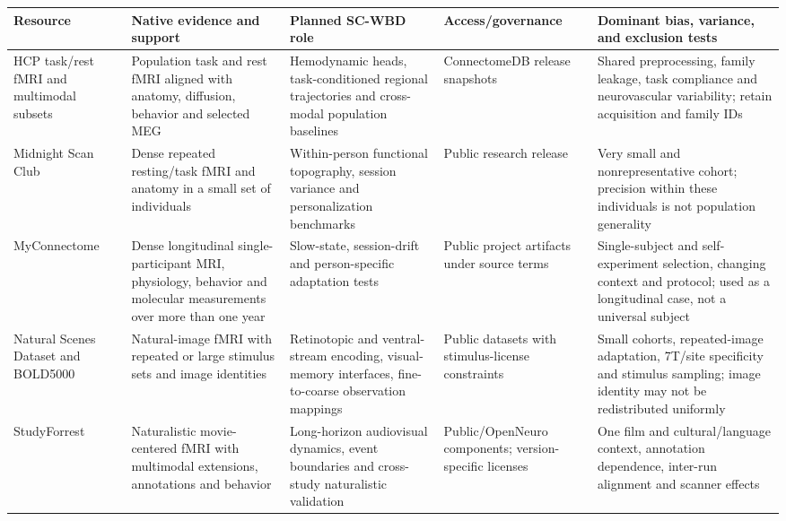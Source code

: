 \clearpage
\begin{table}[!h]
\centering
\footnotesize
\setlength{\tabcolsep}{3pt}
\renewcommand{\arraystretch}{1.08}
\begin{tabularx}{\textwidth}{@{}p{}p{}p{}p{}X@{}}
\toprule
\textbf{Resource} & \textbf{Native evidence and support} &
\textbf{Planned SC-WBD role} & \textbf{Access/governance} &
\textbf{Dominant bias, variance, and exclusion tests}\\
\midrule
HCP task/rest fMRI and multimodal subsets \citep{vanessen2013} &
Population task and rest fMRI aligned with anatomy, diffusion, behavior and
selected MEG &
Hemodynamic heads, task-conditioned regional trajectories and cross-modal
population baselines &
ConnectomeDB release snapshots &
Shared preprocessing, family leakage, task compliance and neurovascular
variability; retain acquisition and family IDs\\

Midnight Scan Club \citep{gordon2017msc} &
Dense repeated resting/task fMRI and anatomy in a small set of individuals &
Within-person functional topography, session variance and personalization
benchmarks &
Public research release &
Very small and nonrepresentative cohort; precision within these individuals
is not population generality\\

MyConnectome \citep{poldrack2015myconnectome} &
Dense longitudinal single-participant MRI, physiology, behavior and molecular
measurements over more than one year &
Slow-state, session-drift and person-specific adaptation tests &
Public project artifacts under source terms &
Single-subject and self-experiment selection, changing context and protocol;
used as a longitudinal case, not a universal subject\\

Natural Scenes Dataset \citep{allen2022nsd} and BOLD5000
\citep{chang2019bold5000} &
Natural-image fMRI with repeated or large stimulus sets and image identities &
Retinotopic and ventral-stream encoding, visual-memory interfaces,
fine-to-coarse observation mappings &
Public datasets with stimulus-license constraints &
Small cohorts, repeated-image adaptation, 7T/site specificity and stimulus
sampling; image identity may not be redistributed uniformly\\

StudyForrest \citep{hanke2014studyforrest} &
Naturalistic movie-centered fMRI with multimodal extensions, annotations and
behavior &
Long-horizon audiovisual dynamics, event boundaries and cross-study
naturalistic validation &
Public/OpenNeuro components; version-specific licenses &
One film and cultural/language context, annotation dependence, inter-run
alignment and scanner effects\\


\end{tabularx}
\end{table}
